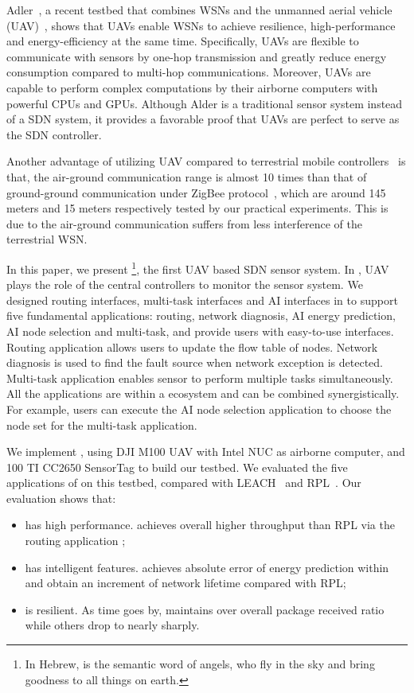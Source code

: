 Adler~\cite{Alder}, a recent testbed that combines WSNs
and the unmanned aerial vehicle (UAV)~\cite{Cambone2005Unmanned, Perry2000Unmanned, Cathcart2014Method},
shows that UAVs enable WSNs to achieve resilience, 
high-performance and energy-efficiency at the same time.
Specifically, UAVs are flexible to 
communicate with sensors by one-hop transmission
and greatly reduce energy consumption compared to multi-hop communications.
Moreover, UAVs are capable to perform complex computations 
by their airborne computers with powerful CPUs and GPUs.
Although Alder is a traditional sensor system instead of a SDN system, 
it provides a favorable proof
that UAVs are perfect to serve as the SDN controller.

Another advantage of utilizing UAV compared to
terrestrial mobile controllers~\cite{Somasundara2007Mobile} is that, the air-ground communication range
is almost 10 times than that of ground-ground communication under ZigBee protocol~\cite{Farahani2008ZigBee}, which are
around 145 meters and 15 meters respectively tested by our practical experiments.
This is due to the air-ground communication suffers from less interference of the terrestrial WSN.

In this paper, we present {\sdn}\footnote{In Hebrew, {\sdn} is the semantic word of angels, who fly in the sky and bring goodness to all things on earth. }, 
the first UAV based SDN sensor system.
In {\sdn}, UAV plays the role of the central controllers to monitor the sensor system.
We designed routing interfaces, multi-task interfaces and AI interfaces in {\sdn} to support
five fundamental applications: routing, network diagnosis, 
AI energy prediction, AI node selection and multi-task,
and provide users with easy-to-use interfaces.
Routing application allows users to update the flow table of nodes.
Network diagnosis is used to find the fault source when network exception is detected.
Multi-task application enables sensor to perform multiple 
tasks simultaneously. All the applications are within a ecosystem
and can be combined synergistically. For example,
users can execute the AI node selection application to choose
the node set for the multi-task application. 


We implement {\sdn}, using DJI M100 UAV with Intel NUC as airborne computer, 
and 100 TI CC2650 SensorTag to build our testbed.
We evaluated the five applications of  {\sdn} on this testbed, 
compared with LEACH~\cite{kaur2016wsn} and RPL~\cite{winter2012rpl}.
Our evaluation shows that:
\begin{itemize}
	\item[1)] {\sdn} has high performance. {\sdn} achieves overall {\simpleTput} higher
		throughput than RPL via the routing application ;
	\item[2)] {\sdn} has intelligent features. {\sdn} achieves absolute error of energy prediction within {\Error} 
		and obtain an {\totalLife} increment of network lifetime compared with RPL;
	\item[3)] {\sdn} is resilient. As time goes by, {\sdn} maintains over
		{\pktRecvRatio} overall package received ratio while others drop to nearly {\OpktRecvRatio}
		sharply.
\end{itemize}

